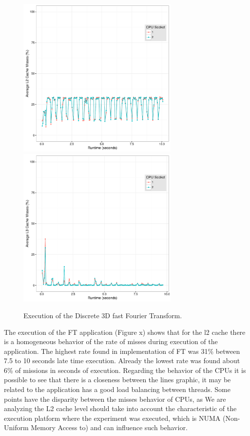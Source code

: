 \documentclass[conference,letter,10pt,final]{IEEEtran}
\begin{document}
\begin{figure}[htp]\label{figFT}
\centering \includegraphics[width=8cm,height=8cm]{img/ftBNas_Analise.pdf}
\centering \includegraphics[width=8cm,height=8cm]{img/ftBNas_Analise_l3.pdf}
\caption{Execution of the Discrete 3D fast Fourier Transform.}
\end{figure}

The execution of the FT application (Figure x) shows that for the l2
cache there is a homogeneous behavior of the rate of misses during
execution of the application. The highest rate found in implementation
of FT was 31\% between 7.5 to 10 seconds late time execution. Already
the lowest rate was found about 6\% of missions in seconds of
execution. Regarding the behavior of the CPUs it is possible to see that
there is a closeness between the lines graphic, it may be related to
the application has a good load balancing between threads. Some points
have the disparity between the misses behavior of CPUs, as We are
analyzing the L2 cache level should take into account the
characteristic of the execution platform where the experiment was
executed, which is NUMA (Non-Uniform Memory Access to) and can
influence such behavior. 
\end{document}
